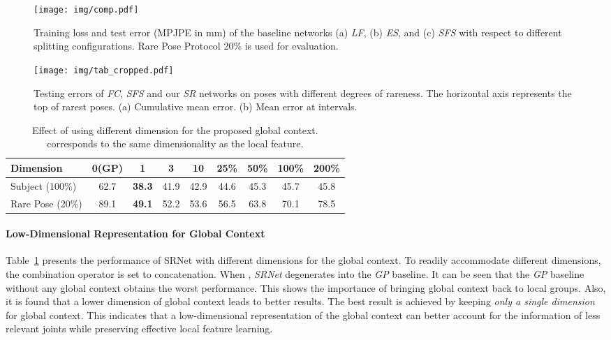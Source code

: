 \documentclass[runningheads]{llncs}
\begin{document}
\begin{figure}[t]
\texttt{[image: img/comp.pdf]}
\caption{Training loss and test error (MPJPE in mm) of the baseline networks (a) \emph{LF}, (b) \emph{ES}, and (c) \emph{SFS} with respect to different splitting configurations. Rare Pose Protocol 20\% is used for evaluation. }
\label{fig:baseline_performance}
\end{figure}

\begin{figure*}[tb]
\begin{center}
\texttt{[image: img/tab\_cropped.pdf]}
\end{center}
\caption{Testing errors of \emph{FC}, \emph{SFS} and our \emph{SR} networks on poses with different degrees of rareness. The horizontal axis represents the top  of rarest poses. (a) Cumulative mean error. (b) Mean error at  intervals.}
\label{fig:nn_result}
\end{figure*}
















\begin{table}[h]
\scriptsize{
\begin{center}
\begin{tabular}{ l |c |c|c|c|c|c|c|c}
\hline
Dimension  &0(GP)& 1 & 3 & 10 & 25\%  &50\% &100\% &200\% \\
\hline
Subject (100\%) &62.7&\textbf{38.3} &41.9&42.9&44.6&45.3&45.7&45.8\\
\hline
Rare Pose (20\%) &89.1&\textbf{49.1}&52.2&53.6&56.5&63.8&70.1&78.5\\
\hline
\end{tabular}
\end{center}
}
\caption{Effect of using different dimension  for the proposed global context.  corresponds to the same dimensionality as the local feature.}
\label{tab:low_dim}
\end{table}

\paragraph{\textbf{Low-Dimensional Representation for Global Context}}
Table~\ref{tab:low_dim} presents the performance of SRNet with different dimensions  for the global context. To readily accommodate different dimensions, the combination operator  is set to concatenation. When , \emph{SRNet} degenerates into the \emph{GP} baseline. It can be seen that the \emph{GP} baseline without any global context obtains the worst performance. This shows the importance of bringing global context back to local groups. Also, it is found that a lower dimension of global context leads to better results. The best result is achieved by keeping \emph{only a single dimension} for global context. This indicates that a low-dimensional representation of the global context can better account for the information of less relevant joints while preserving effective local feature learning.
\end{document}
